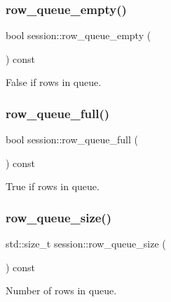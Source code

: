 \subsubsection{\texorpdfstring{row\+\_\+queue\+\_\+empty()}{row\_queue\_empty()}}
{\footnotesize\ttfamily bool session\+::row\+\_\+queue\+\_\+empty (\begin{DoxyParamCaption}{ }\end{DoxyParamCaption}) const\hspace{0.3cm}{\ttfamily [inline]}}



False if rows in queue. 

\mbox{\label{classsession_ab3f9dd34138fa63e19d2e95bb50741d0}} 
\subsubsection{\texorpdfstring{row\+\_\+queue\+\_\+full()}{row\_queue\_full()}}
{\footnotesize\ttfamily bool session\+::row\+\_\+queue\+\_\+full (\begin{DoxyParamCaption}{ }\end{DoxyParamCaption}) const\hspace{0.3cm}{\ttfamily [inline]}}



True if rows in queue. 

\mbox{\label{classsession_ab1519e6ca9a36bdee16c4765828d345e}} 
\subsubsection{\texorpdfstring{row\+\_\+queue\+\_\+size()}{row\_queue\_size()}}
{\footnotesize\ttfamily std\+::size\+\_\+t session\+::row\+\_\+queue\+\_\+size (\begin{DoxyParamCaption}{ }\end{DoxyParamCaption}) const\hspace{0.3cm}{\ttfamily [inline]}}



Number of rows in queue. 

\mbox{\label{classsession_af9ad7820dfc4dddfeaae34d338cd4fca}} 
